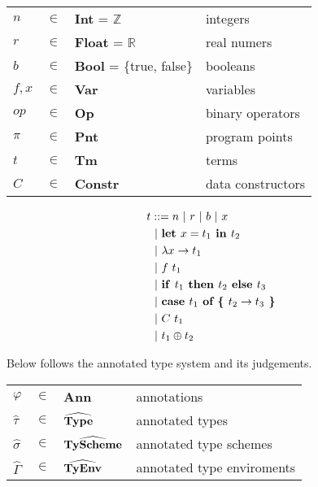 \documentclass[10pt]{article}
\newcommand{\keyw}[1]{\textrm{\textbf{#1}}}
\newcommand{\GammaH}{\widehat{\Gamma}}
\newcommand{\tauH}{\widehat{\tau}}
\newcommand{\sigmaH}{\widehat{\sigma}}
\newcommand{\letin}[2]{\keyw{let~} #1 \keyw{~in~} #2}
\newcommand{\lam}[2]{\keyw{$\lambda$} #1 \rightarrow #2} %
\newcommand{\ite}[3]{\keyw{if~} #1 \keyw{~then~} #2 \keyw{~else~} #3}
\newcommand{\case}[3]{\keyw{case~} #1 \keyw{~of \{~} #2 \rightarrow #3 \keyw{~\}}}
\newcommand{\app}[2]{#1 ~ #2}
\newcommand{\con}[2]{#1 ~ #2}
\newcommand{\infix}[2]{#1 \oplus #2}
\begin{document}

\begin{table}[htp]
	\centering
	\begin{tabular}{llll}
		$n$     & $\in$     & \textbf{Int} = $\mathbb{Z}$         & integers\\
		$r$     & $\in$     & \textbf{Float} = $\mathbb{R}$       & real numers\\
		$b$     & $\in$     & \textbf{Bool} = \{true, false\}   & booleans\\
		$f,x$   & $\in$     & \textbf{Var}                      & variables\\
		$op$    & $\in$     & \textbf{Op}                       & binary operators\\
		$\pi$   & $\in$     & \textbf{Pnt}                      & program points\\
		$t$     & $\in$     & \textbf{Tm}                       & terms\\
		$C$     & $\in$     & \textbf{Constr}                   & data constructors\\
	\end{tabular}
\end{table}

\begin{align*}
	t   & ::= n ~|~ r ~|~ b ~|~ x\\
		& ~|~ \letin{x = t_1}{t_2}\\
		& ~|~ \lam{x}{t_1}\\
		& ~|~ \app{f}{t_1}\\
		& ~|~ \ite{t_1}{t_2}{t_3}\\
		& ~|~ \case{t_1}{t_2}{t_3}\\
		& ~|~ \con{C}{t_1}\\
		& ~|~ \infix{t_1}{t_2}\\
\end{align*}

Below follows the annotated type system and its judgements.

\begin{table}[htp]
	\centering
	\begin{tabular}{llll}
		$\varphi$ & $\in$   & \textbf{Ann}                           & annotations\\
		$\tauH$   & $\in$   & $\widehat{\textrm{\textbf{Type}}}$     & annotated types\\
		$\sigmaH$ & $\in$   & $\widehat{\textrm{\textbf{TyScheme}}}$ & annotated type schemes\\
		$\GammaH$ & $\in$   & $\widehat{\textrm{\textbf{TyEnv}}}$    & annotated type enviroments\\
	\end{tabular}
\end{table}
\end{document}
